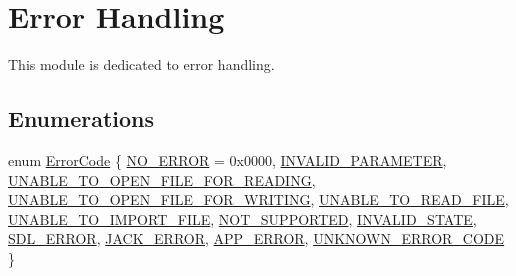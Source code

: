 \hypertarget{group__error__group}{}\section{Error Handling}
\label{group__error__group}


This module is dedicated to error handling.  


\subsection*{Enumerations}
\begin{DoxyCompactItemize}
\item 
enum \hyperlink{group__error__group_ga59e56af19e754a6aa26a612ebf91d05f}{Error\+Code} \{ \newline
\hyperlink{group__error__group_gga59e56af19e754a6aa26a612ebf91d05fabf350750d0d4fabd8954c0f1e9bbae94}{N\+O\+\_\+\+E\+R\+R\+OR} = 0x0000, 
\hyperlink{group__error__group_gga59e56af19e754a6aa26a612ebf91d05fa0d213a9ce640867b78937ff030c6c76f}{I\+N\+V\+A\+L\+I\+D\+\_\+\+P\+A\+R\+A\+M\+E\+T\+ER}, 
\hyperlink{group__error__group_gga59e56af19e754a6aa26a612ebf91d05face1c457724777c90dbb21eb78cde4ced}{U\+N\+A\+B\+L\+E\+\_\+\+T\+O\+\_\+\+O\+P\+E\+N\+\_\+\+F\+I\+L\+E\+\_\+\+F\+O\+R\+\_\+\+R\+E\+A\+D\+I\+NG}, 
\hyperlink{group__error__group_gga59e56af19e754a6aa26a612ebf91d05faf97c14c5fb1bc0a6b8b19fb96532b7d6}{U\+N\+A\+B\+L\+E\+\_\+\+T\+O\+\_\+\+O\+P\+E\+N\+\_\+\+F\+I\+L\+E\+\_\+\+F\+O\+R\+\_\+\+W\+R\+I\+T\+I\+NG}, 
\newline
\hyperlink{group__error__group_gga59e56af19e754a6aa26a612ebf91d05fa05530b4c73c413c68420467bb3849903}{U\+N\+A\+B\+L\+E\+\_\+\+T\+O\+\_\+\+R\+E\+A\+D\+\_\+\+F\+I\+LE}, 
\hyperlink{group__error__group_gga59e56af19e754a6aa26a612ebf91d05fafc9167af8c15765c886bc48a4812ad57}{U\+N\+A\+B\+L\+E\+\_\+\+T\+O\+\_\+\+I\+M\+P\+O\+R\+T\+\_\+\+F\+I\+LE}, 
\hyperlink{group__error__group_gga59e56af19e754a6aa26a612ebf91d05fa9bf1138c8c1f4519e5b814514b750ca3}{N\+O\+T\+\_\+\+S\+U\+P\+P\+O\+R\+T\+ED}, 
\hyperlink{group__error__group_gga59e56af19e754a6aa26a612ebf91d05fa3a01eacac22f2ede34b2e254ad6c5f6a}{I\+N\+V\+A\+L\+I\+D\+\_\+\+S\+T\+A\+TE}, 
\newline
\hyperlink{group__error__group_gga59e56af19e754a6aa26a612ebf91d05fa8a98e7877e367accbc17e4c1b333a422}{S\+D\+L\+\_\+\+E\+R\+R\+OR}, 
\hyperlink{group__error__group_gga59e56af19e754a6aa26a612ebf91d05fa8dec6f40e00f4411723a80830addf416}{J\+A\+C\+K\+\_\+\+E\+R\+R\+OR}, 
\hyperlink{group__error__group_gga59e56af19e754a6aa26a612ebf91d05fa0a53212262724ecd8005236640d22c96}{A\+P\+P\+\_\+\+E\+R\+R\+OR}, 
\hyperlink{group__error__group_gga59e56af19e754a6aa26a612ebf91d05fa4d17e74c73af4c7b64c944c78d07da2a}{U\+N\+K\+N\+O\+W\+N\+\_\+\+E\+R\+R\+O\+R\+\_\+\+C\+O\+DE}
 \}
\end{DoxyCompactItemize}
